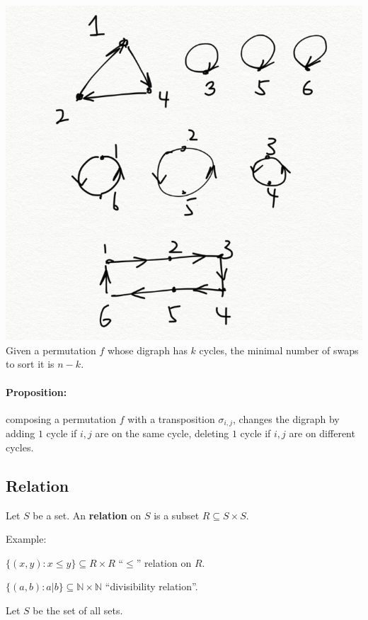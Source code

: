 \documentclass[a4paper, 11pt, twoside]{article}
\begin{document}
\includegraphics[width=\textwidth]{images/swaps}\\

Given a permutation $f$ whose digraph has $k$ cycles, the minimal number of swaps to sort it is $n-k$.\\

\paragraph{Proposition:} composing a permutation $f$ with a transposition $\sigma_{i,j}$, changes the digraph by adding $1$ cycle if $i,j$ are on the same cycle, deleting $1$ cycle if $i,j$ are on different cycles.\\

\subsection{Relation}

Let $S$ be a set. An \textbf{relation} on $S$ is a subset $R\subseteq S\times S$.

Example: 

$\{(x,y):x\leq y\}\subseteq R\times R$ ``$\leq$'' relation on $R$.

$\{(a,b):a|b\}\subseteq \mathbb{N}\times\mathbb{N}$ ``divisibility relation''.

Let $S$ be the set of all sets.
\end{document}

